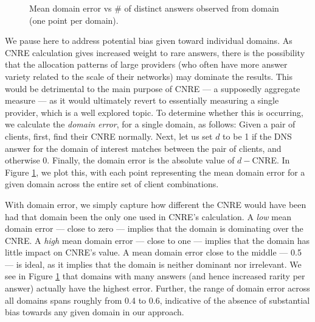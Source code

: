 \begin{figure}
    \caption{Mean domain error vs \# of distinct answers observed from domain
    (one point per domain).}
    \label{fig:domerr}
\end{figure}

We pause here to address potential bias given toward individual domains. As CNRE
calculation gives increased weight to rare answers, there is the possibility
that the allocation patterns of large providers (who often have more answer
variety related to the scale of their networks) may dominate the results. This
would be detrimental to the main purpose of CNRE --- a supposedly aggregate
measure --- as it would ultimately revert to essentially measuring a single
provider, which is a well explored topic. To determine whether this is occurring,
we calculate the \emph{domain error}, for a single domain, as follows: Given a
pair of clients, first, find their CNRE normally. Next, let us set $d$ to be 1
if the DNS answer for the domain of interest matches between the pair of
clients, and otherwise 0. Finally, the domain error is the absolute value of \(d
- \)CNRE. In Figure \ref{fig:domerr}, we plot this, with each
point representing the mean domain error for a given domain across
the entire set of client combinations. 

With domain error, we simply capture how different the CNRE would have
been had that domain been the only one used in CNRE's calculation. A \emph{low}
mean domain
error --- close to zero --- implies that the domain is dominating over the
CNRE. A \emph{high} mean domain error --- close to one --- implies that the domain has little impact
on CNRE's value. A mean domain error close to the middle --- 0.5 --- is ideal,
as it implies that the domain is neither dominant nor irrelevant. We see in
Figure \ref{fig:domerr} that domains with many answers (and hence increased rarity per
answer) actually have the highest error. Further, the range of domain error
across all domains spans roughly from 0.4 to 0.6, indicative of the absence of
substantial bias towards any given domain in our approach.

